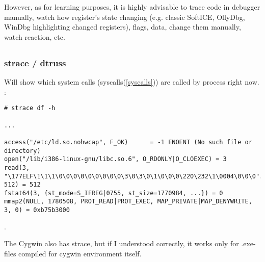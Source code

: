 {However, as for learning purposes, it is highly advisable to trace code in debugger manually, watch how register's state
changing (e.g. classic SoftICE, OllyDbg, WinDbg highlighting changed registers), flags, data, change them
manually, watch reaction, etc.}

\subsection{}

\label{strace}
\subsubsection{strace / dtruss}

{Will show which system calls (syscalls(\ref{syscalls})) are called by process right now}.
:

\begin{lstlisting}
# strace df -h

...

access("/etc/ld.so.nohwcap", F_OK)      = -1 ENOENT (No such file or directory)
open("/lib/i386-linux-gnu/libc.so.6", O_RDONLY|O_CLOEXEC) = 3
read(3, "\177ELF\1\1\1\0\0\0\0\0\0\0\0\0\3\0\3\0\1\0\0\0\220\232\1\0004\0\0\0"..., 512) = 512
fstat64(3, {st_mode=S_IFREG|0755, st_size=1770984, ...}) = 0
mmap2(NULL, 1780508, PROT_READ|PROT_EXEC, MAP_PRIVATE|MAP_DENYWRITE, 3, 0) = 0xb75b3000
\end{lstlisting}

.

{The Cygwin also has strace, but if I understood correctly, it works only for .exe-files
compiled for cygwin environment itself}.

